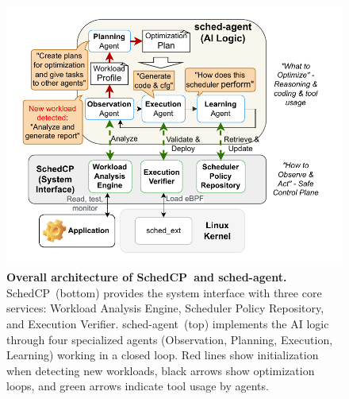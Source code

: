 \documentclass[preprint]{article}
\newcommand{\sys}{SchedCP\xspace}
\newcommand{\agent}{sched-agent\xspace}
\begin{document}
\begin{figure}
    \centering
    \includegraphics[width=\columnwidth]{sections/img/arch-scheddcp.pdf}
    \caption{
        \textbf{Overall architecture of \sys\ and \agent.} 
        \sys\ (bottom) provides the system interface with three core services: Workload Analysis Engine, Scheduler Policy Repository, and Execution Verifier.
        \agent\ (top) implements the AI logic through four specialized agents (Observation, Planning, Execution, Learning) working in a closed loop. Red lines show initialization when detecting new workloads, black arrows show optimization loops, and green arrows indicate tool usage by agents.
    }
    \label{fig:frameworkarch}
\end{figure}
\end{document}
